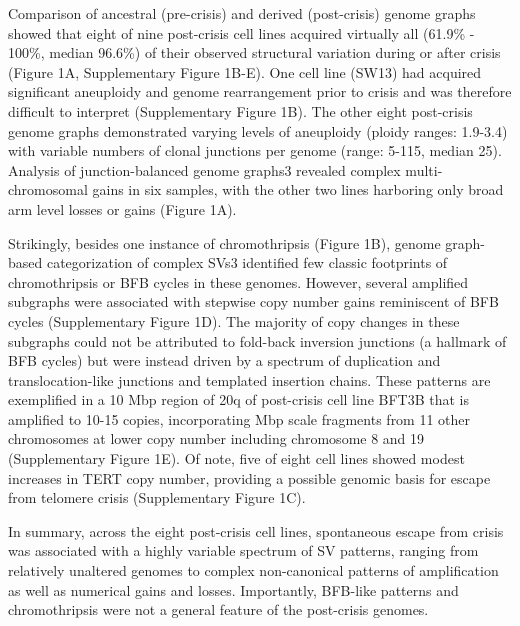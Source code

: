 \documentclass[phd,tocprelim]{cornell}
\begin{document}
Comparison of ancestral (pre-crisis) and derived (post-crisis) genome graphs showed that eight of nine post-crisis cell lines acquired virtually all (61.9\% - 100\%, median 96.6\%) of their observed structural variation during or after crisis (Figure 1A, Supplementary Figure 1B-E). One cell line (SW13) had acquired significant aneuploidy and genome rearrangement prior to crisis and was therefore difficult to interpret (Supplementary Figure 1B). The other eight post-crisis genome graphs demonstrated varying levels of aneuploidy (ploidy ranges: 1.9-3.4) with variable numbers of clonal junctions per genome (range: 5-115, median 25). Analysis of junction-balanced genome graphs3 revealed complex multi-chromosomal gains in six samples, with the other two lines harboring only broad arm level losses or gains (Figure 1A).

Strikingly, besides one instance of chromothripsis (Figure 1B), genome graph-based categorization of complex SVs3 identified few classic footprints of chromothripsis or BFB cycles in these genomes. However, several amplified subgraphs were associated with stepwise copy number gains reminiscent of BFB cycles (Supplementary Figure 1D). The majority of copy changes in these subgraphs could not be attributed to fold-back inversion junctions (a hallmark of BFB cycles) but were instead driven by a spectrum of duplication and translocation-like junctions and templated insertion chains. These patterns are exemplified in a 10 Mbp region of 20q of post-crisis cell line BFT3B that is amplified to 10-15 copies, incorporating Mbp scale fragments from 11 other chromosomes at lower copy number including chromosome 8 and 19 (Supplementary Figure 1E). Of note, five of eight cell lines showed modest increases in TERT copy number, providing a possible genomic basis for escape from telomere crisis (Supplementary Figure 1C). 

In summary, across the eight post-crisis cell lines, spontaneous escape from crisis was associated with a highly variable spectrum of SV patterns, ranging from relatively unaltered genomes to complex non-canonical patterns of amplification as well as numerical gains and losses. Importantly, BFB-like patterns and chromothripsis were not a general feature of the post-crisis genomes. 
\end{document}
